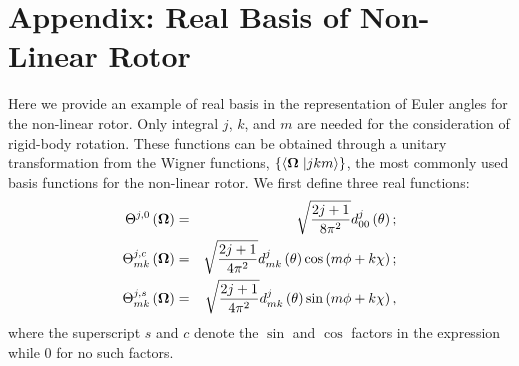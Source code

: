 \documentclass[12pt]{iopart}
\begin{document}
\section*{Appendix: Real Basis of Non-Linear Rotor} \label{app:real_basis}

Here we provide an example of real basis in the representation of Euler angles for the non-linear rotor. Only integral $j$, $k$, and $m$ are needed for the consideration of rigid-body rotation. These functions can be obtained through a unitary transformation from the Wigner functions, $\left\{\left<{\bf \Omega}\right.\left|jkm\right>\right\}$, the most commonly used basis functions for the non-linear rotor. We first define three real functions:
\begin{eqnarray}
\Theta^{j,0}\left({\bf \Omega}\right)&=&\sqrt{\frac{2j+1}{8\pi^2}}d^j_{00}\left(\theta\right);\\
\Theta^{j,c}_{mk}\left({\bf \Omega}\right)&=&\sqrt{\frac{2j+1}{4\pi^2}}d^j_{mk}\left(\theta\right)\cos\left(m\phi+k\chi \right);\\
\Theta^{j,s}_{mk}\left({\bf \Omega}\right)&=&\sqrt{\frac{2j+1}{4\pi^2}}d^j_{mk}\left(\theta\right)\sin\left(m\phi+k\chi \right),
\end{eqnarray}
where the superscript $s$ and $c$ denote the $\sin$ and $\cos$ factors in the expression while $0$ for no such factors.
\end{document}
